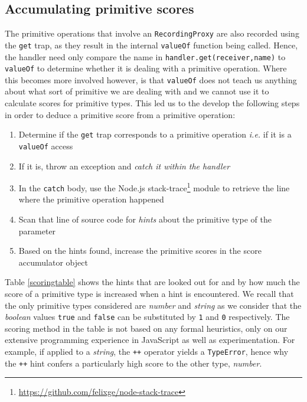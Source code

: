 \subsection{Accumulating primitive scores}
The primitive operations that involve an \texttt{RecordingProxy} are also recorded using the \texttt{get} trap, as they result in the internal \texttt{valueOf} function being called. Hence, the handler need only compare the name in \texttt{handler.get(receiver,name)} to \texttt{valueOf} to determine whether it is dealing with a primitive operation. Where this becomes more involved however, is that \texttt{valueOf} does not teach us anything about what sort of primitive we are dealing with and we cannot use it to calculate scores for primitive types. This led us to the develop the following steps in order to deduce a primitive score from a primitive operation:

\begin{enumerate}
   \item Determine if the \texttt{get} trap corresponds to a primitive operation \emph{i.e.} if it is a \texttt{valueOf} access
   \item If it is, throw an exception and \emph{catch it within the handler}
   \item In the \texttt{catch} body, use the Node.js \textsf{stack-trace}\footnote{\url{https://github.com/felixge/node-stack-trace}} module to retrieve the line where the primitive operation happened
   \item Scan that line of source code for \emph{hints} about the primitive type of the parameter
   \item Based on the hints found, increase the primitive scores in the score accumulator object
\end{enumerate}

Table \ref{scoringtable} shows the hints that are looked out for and by how much the score of a primitive type is increased when a hint is encountered. We recall that the only primitive types considered are \emph{number} and \emph{string} as we consider that the \emph{boolean} values \texttt{true} and \texttt{false} can be substituted by \texttt{1} and \texttt{0} respectively. The scoring method in the table is not based on any formal heuristics, only on our extensive programming experience in JavaScript as well as experimentation. For example, if applied to a \emph{string}, the \texttt{++} operator yields a \texttt{TypeError}, hence why the \texttt{++} hint confers a particularly high score to the other type, \emph{number}.

